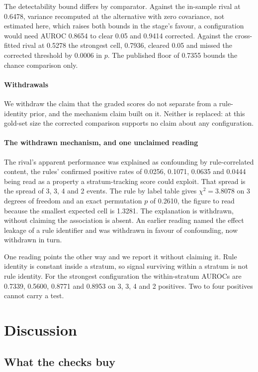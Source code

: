 \documentclass[review]{elsarticle}
\begin{document}
The detectability bound differs by comparator. Against the in-sample rival at
0.6478, variance recomputed at the alternative with zero covariance, not estimated
here, which raises both bounds in the stage's favour, a configuration would need AUROC 0.8654 to clear
0.05 and 0.9414 corrected. Against the cross-fitted rival at 0.5278 the
strongest cell, 0.7936, cleared 0.05 and missed the corrected threshold by
0.0006 in $p$. The published floor of 0.7355 bounds the chance comparison
only.

\paragraph{Withdrawals}
We withdraw the claim that the graded scores do not separate from a
rule-identity prior, and the mechanism claim built on it. Neither is replaced: at
this gold-set size the corrected comparison supports no claim about any
configuration.


\paragraph{The withdrawn mechanism, and one unclaimed reading}
The rival's apparent performance was explained as confounding by rule-correlated
content, the rules' confirmed positive rates of 0.0256, 0.1071, 0.0635 and 0.0444
being read as a property a stratum-tracking score could exploit. That spread is
the spread of 3, 3, 4 and 2 events. The rule by label table gives
$\chi^{2} = 3.8078$ on 3 degrees of freedom and an exact permutation $p$ of
0.2610, the figure to read because the smallest expected cell is 1.3281. The
explanation is withdrawn, without claiming the association is absent. An earlier
reading named the effect leakage of a rule identifier and was withdrawn in favour
of confounding, now withdrawn in turn.

One reading points the other way and we report it without claiming it. Rule
identity is constant inside a stratum, so signal surviving within a stratum is
not rule identity. For the strongest configuration the within-stratum AUROCs are
0.7339, 0.5600, 0.8771 and 0.8953 on 3, 3, 4 and 2 positives. Two to four
positives cannot carry a test.

\section{Discussion}
\label{sec:discussion}

\subsection{What the checks buy}
\end{document}
